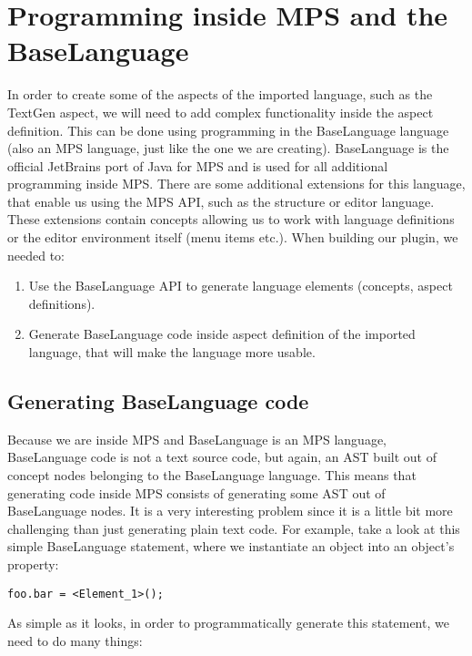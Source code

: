 \section{Programming inside MPS and the BaseLanguage}
\label{chap:generating_code_inside_mps}

In order to create some of the aspects of the imported language, such as the TextGen aspect, we will need to add complex functionality inside the aspect definition.
This can be done using programming in the BaseLanguage language (also an MPS language, just like the one we are creating).
BaseLanguage is the official JetBrains port of Java for MPS and is used for all additional programming inside MPS.
There are some additional extensions for this language, that enable us using the MPS API, such as the structure or editor language.
These extensions contain concepts allowing us to work with language definitions or the editor environment itself (menu items etc.).
When building our plugin, we needed to:

\begin{enumerate}
	\item Use the BaseLanguage API to generate language elements (concepts, aspect definitions).

	\item Generate BaseLanguage code inside aspect definition of the imported language, that will make the language more usable.
\end{enumerate}

\subsection{Generating BaseLanguage code}

Because we are inside MPS and BaseLanguage is an MPS language, BaseLanguage code is not a text source code, but again, an AST built out of concept nodes belonging to the BaseLanguage language.
This means that generating code inside MPS consists of generating some AST out of BaseLanguage nodes.
It is a very interesting problem since it is a little bit more challenging than just generating plain text code.
For example, take a look at this simple BaseLanguage statement, where we instantiate an object into an object's property:

\begin{center}
	\texttt{foo.bar = <Element{\_}1>();}
\end{center}

\noindent
As simple as it looks, in order to programmatically generate this statement, we need to do many things:

